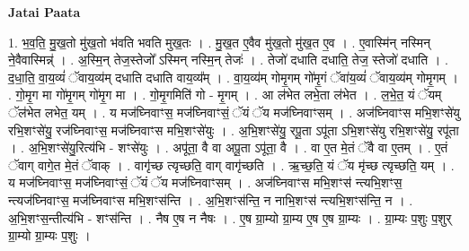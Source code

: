 \documentclass[17pt]{extarticle}
\begin{document}
\textbf{Jatai Paata} \newline

1. भ॒व॒ति॒ मु॒ख॒तो मु॑ख॒तो भ॑वति भवति मुख॒तः । . मु॒ख॒त ए॒वैव मु॑ख॒तो मु॑ख॒त ए॒व । . ए॒वास्मि॑न् नस्मिन् ने॒वैवास्मिन्न्॑ । . अ॒स्मि॒न् तेज॒स्तेजो᳚ ऽस्मिन् नस्मि॒न् तेजः॑ । . तेजो॑ दधाति दधाति॒ तेज॒ स्तेजो॑ दधाति । . द॒धा॒ति॒ वा॒य॒व्यं॑ ॅवाय॒व्य॑म् दधाति दधाति वाय॒व्य᳚म् । . वा॒य॒व्य॑म् गोमृ॒गम् गो॑मृ॒गं ॅवा॑य॒व्यं॑ ॅवाय॒व्य॑म् गोमृ॒गम् । . गो॒मृ॒ग मा गो॑मृ॒गम् गो॑मृ॒ग मा । . गो॒मृ॒गमिति॑ गो - मृ॒गम् । . आ ल॑भेत लभे॒ता ल॑भेत । . ल॒भे॒त॒ यं ॅयम् ॅल॑भेत लभेत॒ यम् । . य मज॑घ्निवाꣳस॒ मज॑घ्निवाꣳसं॒ ॅयं ॅय मज॑घ्निवाꣳसम् । . अज॑घ्निवाꣳस मभि॒शꣳसे॑यु रभि॒शꣳसे॑यु॒ रज॑घ्निवाꣳस॒ मज॑घ्निवाꣳस मभि॒शꣳसे॑युः । . अ॒भि॒शꣳसे॑यु॒ रपू॒ता ऽपू॑ता ऽभि॒शꣳसे॑यु रभि॒शꣳसे॑यु॒ रपू॑ता । . अ॒भि॒शꣳसे॑यु॒रित्य॑भि - शꣳसे॑युः । . अपू॑ता॒ वै वा अपू॒ता ऽपू॑ता॒ वै । . वा ए॒त मे॒तं ॅवै वा ए॒तम् । . ए॒तं ॅवाग् वागे॒त मे॒तं ॅवाक् । . वागृ॑च्छ त्यृच्छति॒ वाग् वागृ॑च्छति । . ऋ॒च्छ॒ति॒ यं ॅय मृ॑च्छ त्यृच्छति॒ यम् । . य मज॑घ्निवाꣳस॒ मज॑घ्निवाꣳसं॒ ॅयं ॅय मज॑घ्निवाꣳसम् । . अज॑घ्निवाꣳस मभि॒शꣳस॑ न्त्यभि॒शꣳस॒ न्त्यज॑घ्निवाꣳस॒ मज॑घ्निवाꣳस मभि॒शꣳस॑न्ति । . अ॒भि॒शꣳस॑न्ति॒ न नाभि॒शꣳस॑ न्त्यभि॒शꣳस॑न्ति॒ न । . अ॒भि॒शꣳस॒न्तीत्य॑भि - शꣳस॑न्ति । . नैष ए॒ष न नैषः । . ए॒ष ग्रा॒म्यो ग्रा॒म्य ए॒ष ए॒ष ग्रा॒म्यः । . ग्रा॒म्यः प॒शुः प॒शुर् ग्रा॒म्यो ग्रा॒म्यः प॒शुः । \newline
\end{document}

